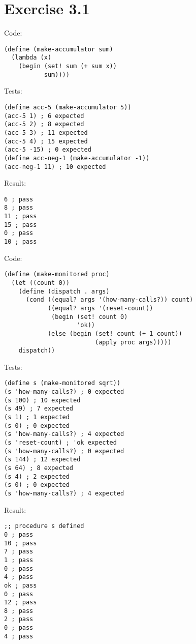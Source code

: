 \documentclass[../main.tex]{subfiles}
\begin{document}
\section{Exercise 3.1}

Code:

\begin{lstlisting}
(define (make-accumulator sum)
  (lambda (x)
    (begin (set! sum (+ sum x))
           sum))))
\end{lstlisting}

Tests:

\begin{lstlisting}
(define acc-5 (make-accumulator 5))
(acc-5 1) ; 6 expected
(acc-5 2) ; 8 expected
(acc-5 3) ; 11 expected
(acc-5 4) ; 15 expected
(acc-5 -15) ; 0 expected
(define acc-neg-1 (make-accumulator -1))
(acc-neg-1 11) ; 10 expected
\end{lstlisting}

Result:

\begin{lstlisting}
6 ; pass
8 ; pass
11 ; pass
15 ; pass
0 ; pass
10 ; pass
\end{lstlisting}

Code:

\begin{lstlisting}
(define (make-monitored proc)
  (let ((count 0))
    (define (dispatch . args)
      (cond ((equal? args '(how-many-calls?)) count)
            ((equal? args '(reset-count))
             (begin (set! count 0)
                    'ok))
            (else (begin (set! count (+ 1 count))
                         (apply proc args)))))
    dispatch))
\end{lstlisting}

Tests:

\begin{lstlisting}
(define s (make-monitored sqrt))
(s 'how-many-calls?) ; 0 expected
(s 100) ; 10 expected
(s 49) ; 7 expected
(s 1) ; 1 expected
(s 0) ; 0 expected
(s 'how-many-calls?) ; 4 expected
(s 'reset-count) ; 'ok expected
(s 'how-many-calls?) ; 0 expected
(s 144) ; 12 expected
(s 64) ; 8 expected
(s 4) ; 2 expected
(s 0) ; 0 expected
(s 'how-many-calls?) ; 4 expected
\end{lstlisting}

Result:

\begin{lstlisting}
;; procedure s defined
0 ; pass
10 ; pass
7 ; pass
1 ; pass
0 ; pass
4 ; pass
ok ; pass
0 ; pass
12 ; pass
8 ; pass
2 ; pass
0 ; pass
4 ; pass
\end{lstlisting}
\end{document}
